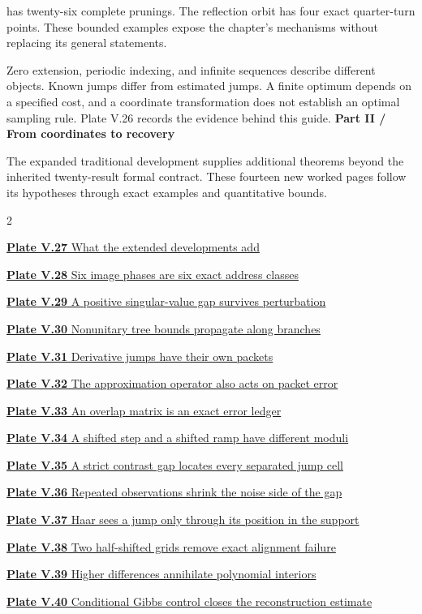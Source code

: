 \documentclass[11pt,letterpaper]{article}
\newcommand{\head}[1]{\par\vspace{2pt}{\sffamily\bfseries\normalsize #1}\par\vspace{1pt}}
\begin{document}
has twenty-six complete prunings. The reflection orbit has four exact
quarter-turn points. These bounded examples expose the chapter's mechanisms
without replacing its general statements.
\head{Read the hypotheses with the picture}
Zero extension, periodic indexing, and infinite sequences describe different
objects. Known jumps differ from estimated jumps. A finite optimum depends
on a specified cost, and a coordinate transformation does not establish an
optimal sampling rule. Plate V.26 records the evidence behind this guide.
\clearpage
{}
{\sffamily\bfseries\Large\color{accent}Part II / From coordinates to recovery}\par\medskip
The expanded traditional development supplies additional theorems beyond the
inherited twenty-result formal contract. These fourteen new worked pages
follow its hypotheses through exact examples and quantitative bounds.
\medskip
\begin{multicols}{2}\raggedright
{\small\noindent\hyperlink{vpage27}{\textbf{Plate V.27} What the extended developments add}\par\medskip}
{\small\noindent\hyperlink{vpage28}{\textbf{Plate V.28} Six image phases are six exact address classes}\par\medskip}
{\small\noindent\hyperlink{vpage29}{\textbf{Plate V.29} A positive singular-value gap survives perturbation}\par\medskip}
{\small\noindent\hyperlink{vpage30}{\textbf{Plate V.30} Nonunitary tree bounds propagate along branches}\par\medskip}
{\small\noindent\hyperlink{vpage31}{\textbf{Plate V.31} Derivative jumps have their own packets}\par\medskip}
{\small\noindent\hyperlink{vpage32}{\textbf{Plate V.32} The approximation operator also acts on packet error}\par\medskip}
{\small\noindent\hyperlink{vpage33}{\textbf{Plate V.33} An overlap matrix is an exact error ledger}\par\medskip}
{\small\noindent\hyperlink{vpage34}{\textbf{Plate V.34} A shifted step and a shifted ramp have different moduli}\par\medskip}
{\small\noindent\hyperlink{vpage35}{\textbf{Plate V.35} A strict contrast gap locates every separated jump cell}\par\medskip}
{\small\noindent\hyperlink{vpage36}{\textbf{Plate V.36} Repeated observations shrink the noise side of the gap}\par\medskip}
{\small\noindent\hyperlink{vpage37}{\textbf{Plate V.37} Haar sees a jump only through its position in the support}\par\medskip}
{\small\noindent\hyperlink{vpage38}{\textbf{Plate V.38} Two half-shifted grids remove exact alignment failure}\par\medskip}
{\small\noindent\hyperlink{vpage39}{\textbf{Plate V.39} Higher differences annihilate polynomial interiors}\par\medskip}
{\small\noindent\hyperlink{vpage40}{\textbf{Plate V.40} Conditional Gibbs control closes the reconstruction estimate}\par\medskip}
\end{multicols}
\end{document}
